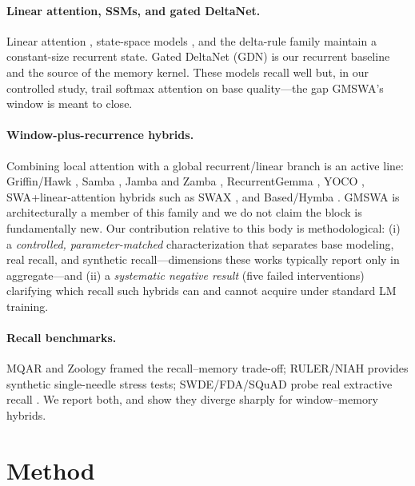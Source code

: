 \documentclass[letterpaper]{article} %
\begin{document}
\paragraph{Linear attention, SSMs, and gated DeltaNet.}
Linear attention \citep{katharopoulos2020transformers}, state-space models \citep{gu2023mamba,dao2024mamba2}, and the delta-rule family \citep{yang2024deltanet,yang2024gateddeltanet} maintain a constant-size recurrent state. Gated DeltaNet (GDN) is our recurrent baseline and the source of the memory kernel. These models recall well but, in our controlled study, trail softmax attention on base quality---the gap GMSWA's window is meant to close.

\paragraph{Window-plus-recurrence hybrids.}
Combining local attention with a global recurrent/linear branch is an active line: Griffin/Hawk \citep{de2024griffin}, Samba \citep{ren2024samba}, Jamba \citep{lieber2024jamba} and Zamba \citep{glorioso2024zamba}, RecurrentGemma \citep{botev2024recurrentgemma}, YOCO \citep{sun2024yoco}, SWA{+}linear-attention hybrids such as SWAX \citep{swax2025}, and Based/Hymba \citep{arora2024based,dong2024hymba}. GMSWA is architecturally a member of this family and we do not claim the block is fundamentally new. Our contribution relative to this body is methodological: (i) a \emph{controlled, parameter-matched} characterization that separates base modeling, real recall, and synthetic recall---dimensions these works typically report only in aggregate---and (ii) a \emph{systematic negative result} (five failed interventions) clarifying which recall such hybrids can and cannot acquire under standard LM training.

\paragraph{Recall benchmarks.}
MQAR and Zoology \citep{arora2023zoology} framed the recall--memory trade-off; RULER/NIAH \citep{hsieh2024ruler} provides synthetic single-needle stress tests; SWDE/FDA/SQuAD probe real extractive recall \citep{arora2024based}. We report both, and show they diverge sharply for window--memory hybrids.

\section{Method}
\end{document}
